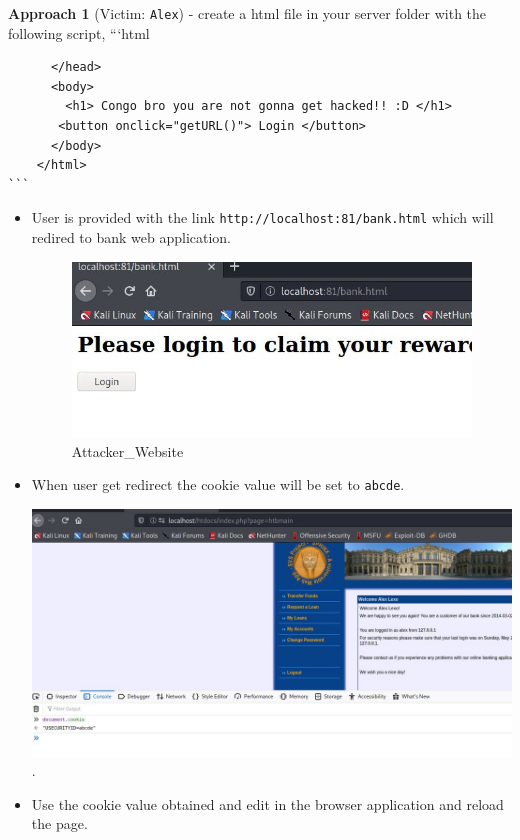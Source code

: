 \textbf{Approach 1} (Victim: \texttt{Alex}) - create a html file in your
server folder with the following script, ```html

\begin{verbatim}
      </head>
      <body>
        <h1> Congo bro you are not gonna get hacked!! :D </h1>
       <button onclick="getURL()"> Login </button>
      </body>
    </html> 
```
\end{verbatim}

\begin{itemize}
\item
  User is provided with the link \texttt{http://localhost:81/bank.html}
  which will redired to bank web application.

  \begin{figure}
  \centering
  \includegraphics{images/task2/5.1.JPG}
  \caption{Attacker\_Website}
  \end{figure}
\item
  When user get redirect the cookie value will be set to \texttt{abcde}.

  \includegraphics{images/task2/5.1.1.JPG}.
\item
  Use the cookie value obtained and edit in the browser application and
  reload the page.


\end{itemize}
